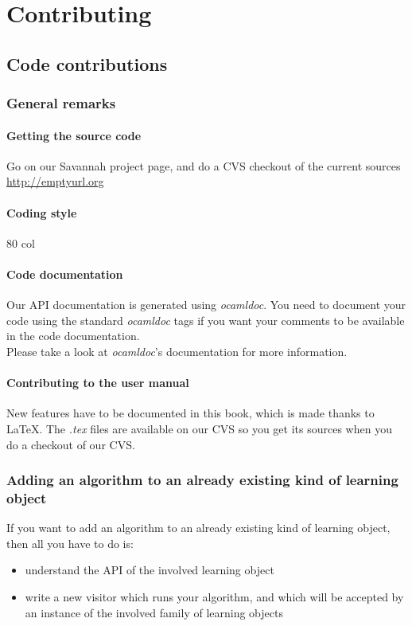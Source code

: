 \part{Contributing}
\chapter{Code contributions}
\section{General remarks}
\subsection{Getting the source code}
Go on our Savannah project page, and do a CVS checkout of the
current sources\\
\url{http://emptyurl.org} \cite{libml:savannah}

\subsection{Coding style}
80 col
\subsection{Code documentation}
Our API documentation is generated using \textit{ocamldoc}. You need to document your code using the standard \textit{ocamldoc} tags if you want your comments to be available in the code documentation.\\
Please take a look at \textit{ocamldoc}'s documentation for more information.

\subsection{Contributing to the user manual}
New features have to be documented in this book, which is made thanks to \LaTeX{}. The \textit{.tex} files are available on our CVS \cite{libml:savannah} so you get its sources when you do a checkout of our CVS. 

\section{Adding an algorithm to an already existing kind of learning object}
If you want to add an algorithm to an already existing kind of learning
object, then all you have to do is:
\begin{itemize}
\item{understand the API of the involved learning object}
\item{write a new visitor which runs your algorithm, and which will be accepted by an instance of the involved family of learning objects}
\end{itemize}

